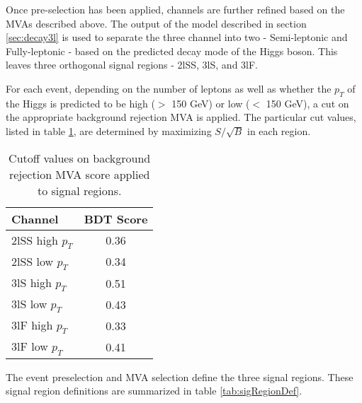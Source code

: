 Once pre-selection has been applied, channels are further refined based on the MVAs described above. The output of the model described in section \ref{sec:decay3l} is used to separate the three channel into two - Semi-leptonic and Fully-leptonic - based on the predicted decay mode of the Higgs boson. This leaves three orthogonal signal regions - 2lSS, 3lS, and 3lF. 

For each event, depending on the number of leptons as well as whether the $p_T$ of the Higgs is predicted to be high ($>$ 150 GeV) or low ($<$ 150 GeV), a cut on the appropriate background rejection MVA is applied. The particular cut values, listed in table \ref{tab:sigBkgCuts}, are determined by maximizing $S/\sqrt{B}$ in each region. 

\begin{table}[h!]
  \begin{center}
  \begin{tabular}{l|c}
  \hline\hline
  Channel & BDT Score \\
  \hline
  2lSS high $p_T$ & 0.36 \\
  2lSS low $p_T$ & 0.34 \\
  3lS high $p_T$ & 0.51 \\
  3lS low $p_T$ & 0.43 \\
  3lF high $p_T$ & 0.33 \\
  3lF low $p_T$ & 0.41 \\
  \hline
  \end{tabular}
  \end{center}
  \caption{Cutoff values on background rejection MVA score applied to signal regions.}
  \label{tab:sigBkgCuts}
\end{table}

The event preselection and MVA selection define the three signal regions. These signal region definitions are summarized in table \ref{tab:sigRegionDef}.

